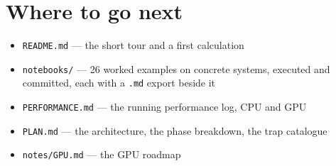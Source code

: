 \documentclass[11pt,a4paper]{article}
\newcommand{\code}[1]{\texttt{\small #1}}
\begin{document}
\section*{Where to go next}

\begin{itemize}\itemsep2pt
\item \code{README.md} --- the short tour and a first calculation
\item \code{notebooks/} --- 26 worked examples on concrete systems, executed and
  committed, each with a \code{.md} export beside it
\item \code{PERFORMANCE.md} --- the running performance log, CPU and GPU
\item \code{PLAN.md} --- the architecture, the phase breakdown, the trap catalogue
\item \code{notes/GPU.md} --- the GPU roadmap
\end{itemize}
\end{document}
